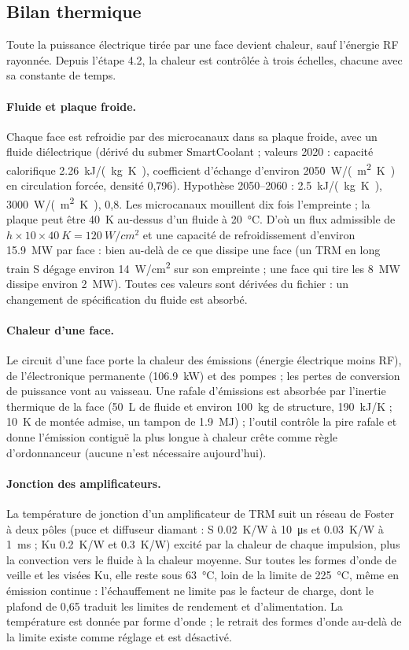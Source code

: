 \documentclass[11pt,a4paper]{article}
\begin{document}
\subsection{Bilan thermique}\label{sec:thermal}
Toute la puissance électrique tirée par une face devient chaleur, sauf l'énergie RF rayonnée. Depuis l'étape 4.2, la
chaleur est contrôlée à trois échelles, chacune avec sa constante de temps.

\paragraph{Fluide et plaque froide.} Chaque face est refroidie par des microcanaux dans sa plaque froide, avec un
fluide diélectrique (dérivé du submer SmartCoolant ; valeurs 2020 : capacité calorifique \SI{2.26}{kJ/(kg.K)},
coefficient d'échange d'environ \SI{2050}{W/(m^2.K)} en circulation forcée, densité 0,796). Hypothèse 2050--2060 :
\SI{2.5}{kJ/(kg.K)}, \SI{3000}{W/(m^2.K)}, 0,8. Les microcanaux mouillent dix fois l'empreinte ; la plaque peut être
\SI{40}{K} au-dessus d'un fluide à \SI{20}{\celsius}. D'où un flux admissible de
$h \times 10 \times \SI{40}{K} = \SI{120}{W/cm^2}$ et une capacité de refroidissement d'environ \SI{15.9}{MW} par face :
bien au-delà de ce que dissipe une face (un TRM en long train S dégage environ \SI{14}{W/cm^2} sur son empreinte ; une
face qui tire les \SI{8}{MW} dissipe environ \SI{2}{MW}). Toutes ces valeurs sont dérivées du fichier : un changement
de spécification du fluide est absorbé.

\paragraph{Chaleur d'une face.} Le circuit d'une face porte la chaleur des émissions (énergie électrique moins RF),
de l'électronique permanente (\SI{106.9}{kW}) et des pompes ; les pertes de conversion de puissance vont au vaisseau.
Une rafale d'émissions est absorbée par l'inertie thermique de la face (\SI{50}{L} de fluide et environ \SI{100}{kg} de
structure, \SI{190}{kJ/K} ; \SI{10}{K} de montée admise, un tampon de \SI{1.9}{MJ}) ; l'outil contrôle la pire rafale
et donne l'émission contiguë la plus longue à chaleur crête comme règle d'ordonnanceur (aucune n'est nécessaire
aujourd'hui).

\paragraph{Jonction des amplificateurs.} La température de jonction d'un amplificateur de TRM suit un réseau de Foster
à deux pôles (puce et diffuseur diamant : S \SI{0.02}{K/W} à \SI{10}{\micro s} et \SI{0.03}{K/W} à \SI{1}{ms} ; Ku
\SI{0.2}{K/W} et \SI{0.3}{K/W}) excité par la chaleur de chaque impulsion, plus la convection vers le fluide à la
chaleur moyenne. Sur toutes les formes d'onde de veille et les visées Ku, elle reste sous \SI{63}{\celsius}, loin de
la limite de \SI{225}{\celsius}, même en émission continue : l'échauffement ne limite pas le facteur de charge, dont le
plafond de 0,65 traduit les limites de rendement et d'alimentation. La température est donnée par forme d'onde ; le
retrait des formes d'onde au-delà de la limite existe comme réglage et est désactivé.
\end{document}
